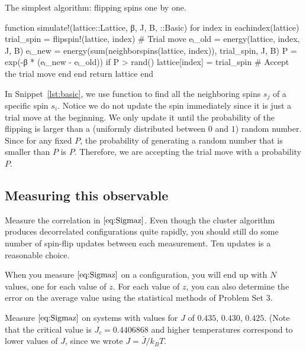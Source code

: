 \begin{algorithm}
    \caption{The simplest algorithm: flipping spins one by one.}
    \label{lst:basic}
    \begin{juliacode}
        function simulate!(lattice::Lattice, β, J, B, ::Basic)
            for index in eachindex(lattice)
                trial_spin = flipspin!(lattice, index)  # Trial move
                eᵢ_old = energy(lattice, index, J, B)
                eᵢ_new = energy(sum(neighborspins(lattice, index)), trial_spin, J, B)
                P = exp(-β * (eᵢ_new - eᵢ_old))
                if P > rand()
                    lattice[index] = trial_spin  # Accept the trial move
                end
            end
            return lattice
        end
    \end{juliacode}
\end{algorithm}

In Snippet~\ref{lst:basic}, we use function  to find all the neighboring
spins \(s_j\) of a specific spin \(s_i\). Notice we do not update the spin immediately
since it is just a trial move at the beginning. We only update it until the probability of
the flipping is larger than a (uniformly distributed between \(0\) and \(1\)) random number.
Since for any fixed \(P\), the probability of generating a random number that is smaller
than \(P\) is \(P\). Therefore, we are accepting the trial move with a probability \(P\).

\subsection{Measuring this observable}

Measure the correlation in \(\eqref{eq:Sigmaz}\). Even
though the cluster algorithm produces decorrelated configurations quite rapidly, you should
still do some number of spin-flip updates between each measurement. Ten updates is a
reasonable choice.

When you measure \(\eqref{eq:Sigmaz}\) on a configuration, you will end up with \(N\)
values, one for each value of \(z\). For each value of \(z\), you can also determine the
error on the average value using the statistical methods of Problem Set 3.

\Question{} Measure \(\eqref{eq:Sigmaz}\) on systems with values for \(J\) of \(0.435\),
\(0.430\), \(0.425\). (Note that the critical value is \(J_c = 0.4406868\) and higher
temperatures correspond to lower values of \(J\), since we wrote \(J = \bar{J} / k_B T\).

